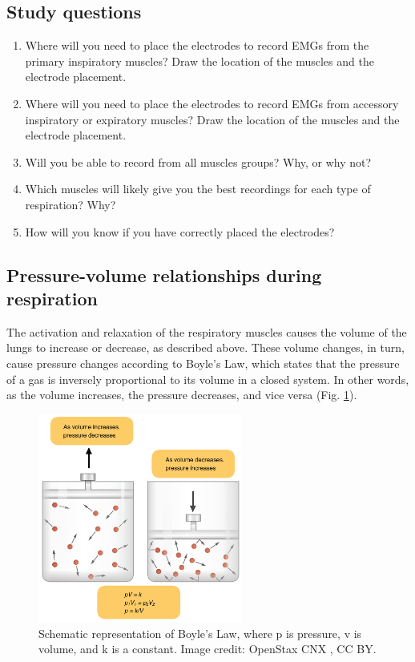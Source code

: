 \documentclass[12pt]{article}
\begin{document}
\subsection*{Study questions} 
\begin{enumerate}
\item Where will you need to place the electrodes to record EMGs from the primary inspiratory muscles? Draw the location of the muscles and the electrode placement.
\item Where will you need to place the electrodes to record EMGs from accessory inspiratory or expiratory muscles? Draw the location of the muscles and the electrode placement.
\item Will you be able to record from all muscles groups? Why, or why not? 
\item Which muscles will likely give you the best recordings for each type of respiration? Why?
\item How will you know if you have correctly placed the electrodes?
\end{enumerate}

\subsection*{Pressure-volume relationships during respiration}

The activation and relaxation of the respiratory muscles causes the volume of the lungs to increase or decrease, as described above. These volume changes, in turn, cause pressure changes according to Boyle's Law, which states that the pressure of a gas is inversely proportional to its volume in a closed system. In other words, as the volume increases, the pressure decreases, and vice versa (Fig. \ref{fig:boyle}).

\begin{figure}[h!]
\centering
\includegraphics[width=0.6\textwidth]{images/Boyles_Law.jpg}
\caption{Schematic representation of Boyle's Law, where p is pressure, v is volume, and k is a constant. Image credit: OpenStax CNX \cite{openStax2016resp}, CC BY.}
\label{fig:boyle}
\end{figure}
\end{document}
